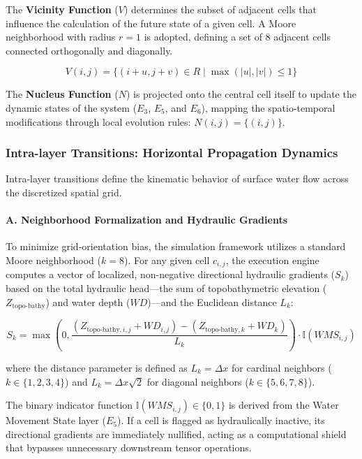The \textbf{Vicinity Function} ($V$) determines the subset of adjacent cells that influence the calculation of the future state of a 
given cell. A Moore neighborhood with radius $r=1$ is adopted, defining a set of 8 adjacent cells connected orthogonally and 
diagonally.

$$V(i,j) = \{ (i+u, j+v) \in R \mid \max(|u|, |v|) \le 1 \}$$

The \textbf{Nucleus Function} ($N$) is projected onto the central cell itself to update the dynamic states of the system ($E_3$, $E_5$, 
and $E_6$), mapping the spatio-temporal modifications through local evolution rules: $N(i,j) = \{ (i,j) \}$.


\subsubsection{Intra-layer Transitions: Horizontal Propagation Dynamics}

Intra-layer transitions define the kinematic behavior of surface water flow across the discretized spatial grid.

\paragraph{A. Neighborhood Formalization and Hydraulic Gradients}

To minimize grid-orientation bias, the simulation framework utilizes a standard Moore neighborhood ($k = 8$). For any given cell $c_{i,j}$, the execution engine computes a vector of localized, non-negative directional hydraulic gradients ($S_k$) based on the total hydraulic head—the sum of topobathymetric elevation ($Z_{\text{topo-bathy}}$) and water depth ($WD$)—and the Euclidean distance $L_k$:

$$S_{k} = \max\left(0, \frac{(Z_{\text{topo-bathy}, i,j} + WD_{i,j}) - (Z_{\text{topo-bathy}, k} + WD_{k})}{L_{k}}\right) \cdot \mathbb{I}(WMS_{i,j})$$

where the distance parameter is defined as $L_k = \Delta x$ for cardinal neighbors ($k \in \{1, 2, 3, 4\}$) and $L_k = \Delta x \sqrt{2}$ for diagonal neighbors ($k \in \{5, 6, 7, 8\}$). 

The binary indicator function $\mathbb{I}(WMS_{i,j}) \in \{0, 1\}$ is derived from the Water Movement State layer ($E_5$). If a cell is flagged as hydraulically inactive, its directional gradients are immediately nullified, acting as a computational shield that bypasses unnecessary downstream tensor operations.

